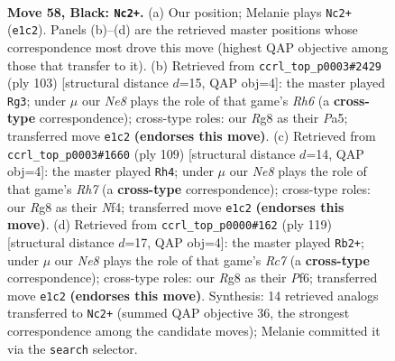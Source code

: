 \documentclass[11pt]{article}
\begin{document}
\clearpage

\begin{figure}[p]\centering
\begin{subfigure}{0.46\textwidth}\centering
\resizebox{\linewidth}{!}{%
\newchessgame
\chessboard[
  setfen={6r1/R7/Pp1k4/1B3p2/5P2/4K3/8/4n3 b - - 0 58},
  showmover=false,
  pgfstyle=straightmove, color=movearrow, markmove={e1-c2}
]}
\caption{}
\end{subfigure}\hfill
\begin{subfigure}{0.46\textwidth}\centering
\resizebox{\linewidth}{!}{%
\newchessgame
\chessboard[
  setfen={4k3/6R1/6P1/p7/1pPK4/7r/8/8 b - - 0 52},
  showmover=false,
  pgfstyle=straightmove, color=movearrow, markmove={h3-g3}
]}
\caption{}
\end{subfigure}
\\[4pt]
\begin{subfigure}{0.46\textwidth}\centering
\resizebox{\linewidth}{!}{%
\newchessgame
\chessboard[
  setfen={8/6p1/3k4/R7/P3Bn2/1K6/7r/8 b - - 20 55},
  showmover=false,
  pgfstyle=straightmove, color=movearrow, markmove={h2-h4}
]}
\caption{}
\end{subfigure}\hfill
\begin{subfigure}{0.46\textwidth}\centering
\resizebox{\linewidth}{!}{%
\newchessgame
\chessboard[
  setfen={R7/P5k1/1K3p2/7p/7P/6P1/2r5/8 b - - 40 60},
  showmover=false,
  pgfstyle=straightmove, color=movearrow, markmove={c2-b2}
]}
\caption{}
\end{subfigure}
\caption{\textbf{Move 58, Black: \texttt{Nc2+}.} (a) Our position; Melanie plays \texttt{Nc2+} (\texttt{e1c2}). Panels (b)--(d) are the retrieved master positions whose correspondence most drove this move (highest QAP objective among those that transfer to it). (b) Retrieved from \texttt{ccrl\_top\_p0003\#2429} (ply 103) [structural distance $d$=15, QAP obj=4]: the master played \texttt{Rg3}; under $\mu$ our \emph{Ne8} plays the role of that game's \emph{Rh6} (a \textbf{cross-type} correspondence); cross-type roles: our \emph{R}g8 as their \emph{P}a5; transferred move \texttt{e1c2} \textbf{(endorses this move)}. (c) Retrieved from \texttt{ccrl\_top\_p0003\#1660} (ply 109) [structural distance $d$=14, QAP obj=4]: the master played \texttt{Rh4}; under $\mu$ our \emph{Ne8} plays the role of that game's \emph{Rh7} (a \textbf{cross-type} correspondence); cross-type roles: our \emph{R}g8 as their \emph{N}f4; transferred move \texttt{e1c2} \textbf{(endorses this move)}. (d) Retrieved from \texttt{ccrl\_top\_p0000\#162} (ply 119) [structural distance $d$=17, QAP obj=4]: the master played \texttt{Rb2+}; under $\mu$ our \emph{Ne8} plays the role of that game's \emph{Rc7} (a \textbf{cross-type} correspondence); cross-type roles: our \emph{R}g8 as their \emph{P}f6; transferred move \texttt{e1c2} \textbf{(endorses this move)}. Synthesis: 14 retrieved analogs transferred to \texttt{Nc2+} (summed QAP objective 36, the strongest correspondence among the candidate moves); Melanie committed it via the \texttt{search} selector.}
\label{fig:thought-m115}
\end{figure}
\end{document}
